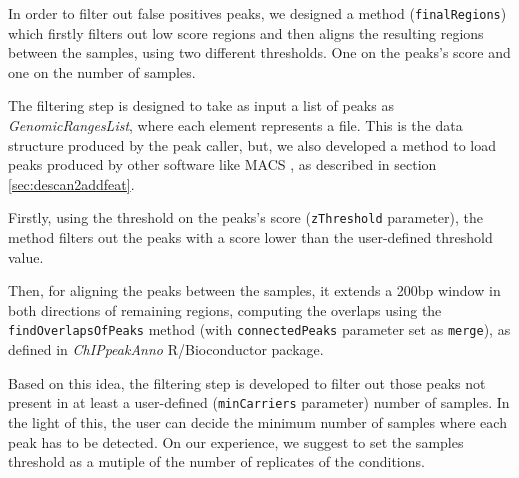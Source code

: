 
In order to filter out false positives peaks, we designed a method (\lstinline{finalRegions}) which firstly filters out low score regions and then aligns the resulting regions between the samples, using two different thresholds.
One on the peaks's score and one on the number of samples.

The filtering step is designed to take as input a list of peaks as \textit{GenomicRangesList}, where each element represents a file.
This is the data structure produced by the peak caller, but, we also developed a method to load peaks produced by other software like MACS \cite{Zhang2008}, as described in section \ref{sec:descan2addfeat}.

Firstly, using the threshold on the peaks's score (\lstinline{zThreshold} parameter), the method filters out the peaks with a score lower than the user-defined threshold value.

Then, for aligning the peaks between the samples, it extends a 200bp window in both directions of remaining regions, computing the overlaps using the \lstinline{findOverlapsOfPeaks} method (with \lstinline{connectedPeaks} parameter set as \lstinline{merge}), as defined in \textit{ChIPpeakAnno} \cite{Zhu2010} R/Bioconductor package.

Based on this idea, the filtering step is developed to filter out those peaks not present in at least a user-defined (\lstinline{minCarriers} parameter) number of samples. In the light of this, the user can decide the minimum number of samples where each peak has to be detected.
On our experience, we suggest to set the samples threshold as a mutiple of the number of replicates of the conditions.

